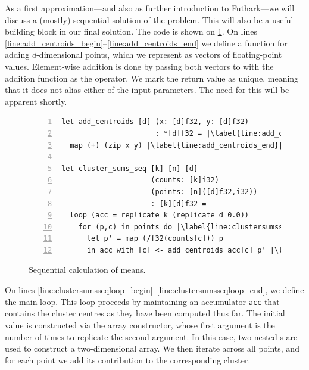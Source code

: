 As a first approximation---and also as further introduction to
Futhark---we will discuss a (mostly) sequential solution of the
problem.  This will also be a useful building block in our final
solution.  The code is shown on \cref{fig:sequential-means}.  On lines
\ref{line:add_centroids_begin}--\ref{line:add_centroids_end} we define
a function for adding $d$-dimensional points, which we represent as
vectors of floating-point values.  Element-wise addition is done by
passing both vectors to  with the addition function as the
operator.  We mark the return value as unique, meaning that it does
not alias either of the input parameters.  The need for this will be
apparent shortly.

\begin{figure}
\begin{lstlisting}[numbers=left,escapechar=|]
let add_centroids [d] (x: [d]f32, y: [d]f32)
                      : *[d]f32 = |\label{line:add_centroids_begin}|
  map (+) (zip x y) |\label{line:add_centroids_end}|

let cluster_sums_seq [k] [n] [d]
                     (counts: [k]i32)
                     (points: [n]([d]f32,i32))
                     : [k][d]f32 =
  loop (acc = replicate k (replicate d 0.0))
    for (p,c) in points do |\label{line:clustersumsseqloop_begin}|
      let p' = map (/f32(counts[c])) p
      in acc with [c] <- add_centroids acc[c] p' |\label{line:clustersumsseqloop_end}|
\end{lstlisting}
\caption{Sequential calculation of means.}
\label{fig:sequential-means}
\end{figure}

On lines
\ref{line:clustersumsseqloop_begin}--\ref{line:clustersumsseqloop_end},
we define the main loop.  This loop proceeds by maintaining an
accumulator \texttt{acc} that contains the cluster centres as they
have been computed thus far.  The initial value is constructed via the
 array constructor, whose first argument is the number
of times to replicate the second argument.  In this case, two nested
s are used to construct a two-dimensional array.  We
then iterate across all points, and for each point we add its
contribution to the corresponding cluster.

